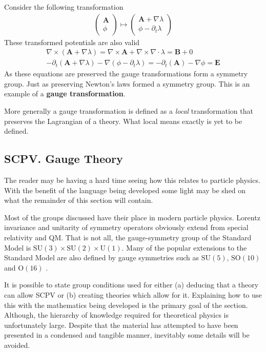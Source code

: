 \documentclass[floatfix,aps,prd,amsmath,amssymb]{revtex4}
\begin{document}
Consider the following transformation
\begin{align*}
\left( \begin{array}{l}
\mathbf{A} \\ \phi
\end{array} \right) \mapsto
\left( \begin{array}{l}
\mathbf{A}+\nabla \lambda \\
\phi - \partial_t \lambda
\end{array} \right)
\end{align*}
These transformed potentials are also valid
\begin{align*}
\nabla \times (\mathbf{A}+\nabla \lambda) = \nabla\times \mathbf{A} + \nabla \times \nabla \cdot \lambda  = \mathbf{B} + 0 \\
-\partial_t(\mathbf{A}+\nabla \lambda)-\nabla (\phi - \partial_t \lambda) = -\partial_t(\mathbf{A})-\nabla \phi = \mathbf{E}
\end{align*}
As these equations are preserved the gauge transformations form a symmetry group. Just as preserving Newton's laws formed a symmetry group. This is an example of a \textbf{gauge transformation}.

More generally a gauge transformation is defined as a \textit{local} transformation that preserves the Lagrangian of a theory. What local means exactly is yet to be defined.

\subsection{SCPV. Gauge Theory}

The reader may be having a hard time seeing how this relates to particle physics. With the benefit of the language being developed some light may be shed on what the remainder of this section will contain.

Most of the groups discussed have their place in modern particle physics. Lorentz invariance and unitarity of symmetry operators obviously extend from special relativity and QM. That is not all, the gauge-symmetry group of the Standard Model is $\mathrm{SU}(3)\times \mathrm{SU}(2)\times \mathrm{U}(1)$. Many of the popular extensions to the Standard Model are also defined by gauge symmetries such as $\mathrm{SU}(5)$, $\mathrm{SO}(10)$ and $\mathrm{O}(16)$ \cite{SCPV4}.

It is possible to state group conditions used for either (a) deducing that a theory can allow SCPV or (b) creating theories which allow for it\cite{SCPV5}. Explaining how to use this with the mathematics being developed is the primary goal of the section. Although, the hierarchy of knowledge required for theoretical physics is unfortunately large. Despite that the material has attempted to have been presented in a condensed and tangible manner, inevitably some details will be avoided.
\end{document}
